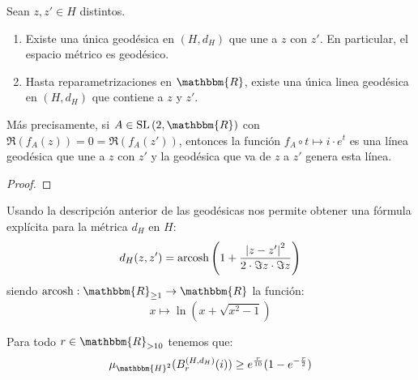 \documentclass[12pt]{report}
\theoremstyle{largebreak}
\newcommand\abs[1]{\ensuremath{\left|#1\right|}}
\newcommand\cf[3]{\ensuremath{#1:#2\rightarrow#3}}
\newcommand{\bbm}[1]{\ensuremath{\mathbbm{#1}}}
\newcommand{\SL}[1]{\ensuremath{\textup{SL}\left(#1\right)}}
\newcommand{\arcosh}[1]{\ensuremath{\textup{arcosh}\left(#1\right)}}
\begin{document}
    \begin{theor}
        \label{caracterizacionGeodesicas}
        Sean $z,z'\in H$ distintos.
        \begin{enumerate}[label = \textit{(\arabic*)}]
            \item Existe una única geodésica en $(H,d_H)$ que une a $z$ con $z'$. En particular, el espacio métrico es geodésico.
            \item Hasta reparametrizaciones en $\bbm{R}$, existe una única linea geodésica en $(H,d_H)$ que contiene a $z$ y $z'$. 
        \end{enumerate}
        Más precisamente, si $A\in\SL{2,\bbm{R}}$ con $\Re(f_A(z))=0=\Re(f_A(z'))$, entonces la función $f_A\circ t\mapsto i\cdot e^{ t}$ es una línea geodésica que une a $z$ con $z'$ y la geodésica que va de $z$ a $z'$ genera esta línea.
    \end{theor}

    \begin{proof}
    \end{proof}

    \begin{obs}
        Usando la descripción anterior de las geodésicas nos permite obtener una fórmula explícita para la métrica $d_H$ en $H$:
        \begin{equation*}
            d_H(z,z')=\arcosh{1+\frac{\abs{z-z'}^2}{2\cdot\Im{z}\cdot\Im{z}}}
        \end{equation*}
        siendo $\cf{\textup{arcosh}}{\bbm{R}_{\geq1}}{\bbm{R}}$ la función:
        \begin{equation*}
            x\mapsto\ln\left(x+\sqrt{x^2-1} \right)
        \end{equation*}
    \end{obs}

    \begin{propo}
        Para todo $r\in\bbm{R}_{>10}$ tenemos que:
        \begin{equation*}
            \mu_{\bbm{H}^2}(B_r^{(H,d_H)}(i))\geq e^{\frac{r}{10}}(1-e^{-\frac{r}{2}})
        \end{equation*}
    \end{propo}
\end{document}
